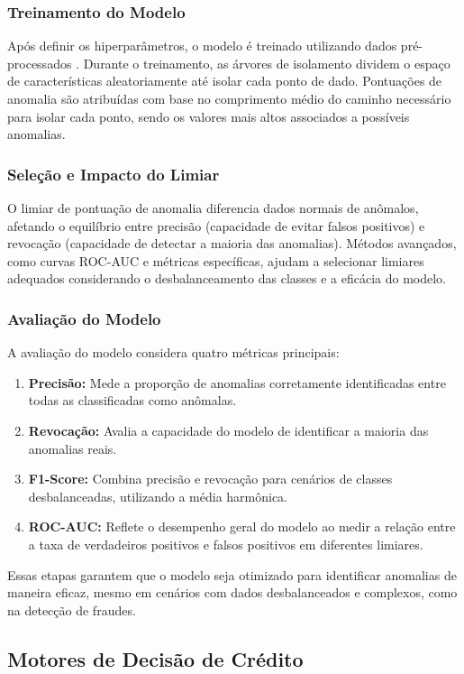 \documentclass[12pt,a4paper]{article}
\begin{document}
\subsubsection{Treinamento do Modelo}
Após definir os hiperparâmetros, o modelo é treinado utilizando dados pré-processados \cite{meduri2024}. Durante o treinamento, as árvores de isolamento dividem o espaço de características aleatoriamente até isolar cada ponto de dado. Pontuações de anomalia são atribuídas com base no comprimento médio do caminho necessário para isolar cada ponto, sendo os valores mais altos associados a possíveis anomalias.

\subsubsection{Seleção e Impacto do Limiar}
O limiar de pontuação de anomalia diferencia dados normais de anômalos, afetando o equilíbrio entre precisão (capacidade de evitar falsos positivos) e revocação (capacidade de detectar a maioria das anomalias). Métodos avançados, como curvas ROC-AUC e métricas específicas, ajudam a selecionar limiares adequados considerando o desbalanceamento das classes e a eficácia do modelo.

\subsubsection{Avaliação do Modelo}
A avaliação do modelo considera quatro métricas principais:
\begin{enumerate}
    \item \textbf{Precisão:} Mede a proporção de anomalias corretamente identificadas entre todas as classificadas como anômalas.
    \item \textbf{Revocação:} Avalia a capacidade do modelo de identificar a maioria das anomalias reais.
    \item \textbf{F1-Score:} Combina precisão e revocação para cenários de classes desbalanceadas, utilizando a média harmônica.
    \item \textbf{ROC-AUC:} Reflete o desempenho geral do modelo ao medir a relação entre a taxa de verdadeiros positivos e falsos positivos em diferentes limiares.
\end{enumerate}

Essas etapas garantem que o modelo seja otimizado para identificar anomalias de maneira eficaz, mesmo em cenários com dados desbalanceados e complexos, como na detecção de fraudes.

\subsection{Motores de Decisão de Crédito}
\end{document}

